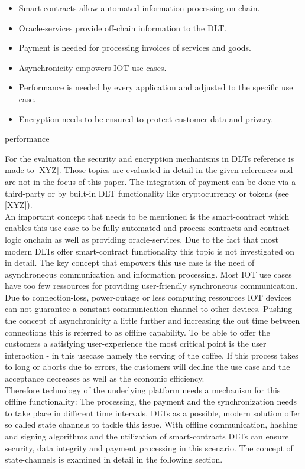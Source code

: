 \documentclass[conference]{IEEEtran}
\begin{document}
\begin{itemize}
  \item Smart-contracts allow automated information processing on-chain.
  \item Oracle-services provide off-chain information to the DLT.
  \item Payment is needed for processing invoices of services and goods.
  \item Asynchronicity empowers IOT use cases.
  \item Performance is needed by every application and adjusted to the specific use case.
  \item Encryption needs to be ensured to protect customer data and privacy.
\end{itemize}

performance

For the evaluation the security and encryption mechanisms in DLTs reference is made to [XYZ]. Those topics are evaluated in detail in the given references and are not in the focus of this paper. The integration of payment can be done via a third-party or by built-in DLT functionality like cryptocurrency or tokens (see [XYZ]).\\
An important concept that needs to be mentioned is the smart-contract which enables this use case to be fully automated and process contracts and contract-logic onchain as well as providing oracle-services. Due to the fact that most modern DLTs offer smart-contract functionality this topic is not investigated on in detail. The key concept that empowers this use case is the need of asynchroneous communication and information processing. Most IOT use cases have too few ressources for providing user-friendly synchroneous communication. Due to connection-loss, power-outage or less computing ressources IOT devices can not guarantee a constant communication channel to other devices. Pushing the concept of asynchronicity a little further and increasing the out time between connections this is referred to as offline capability. To be able to offer the customers a satisfying user-experience the most critical point is the user interaction - in this usecase namely the serving of the coffee. If this process takes to long or aborts due to errors, the customers will decline the use case and the acceptance decreases as well as the economic efficiency.\\
Therefore technology of the underlying platform needs a mechanism for this offline functionality: The processing, the payment and the synchronization needs to take place in different time intervals. DLTs as a possible, modern solution offer so called state channels to tackle this issue. With offline communication, hashing and signing algorithms and the utilization of smart-contracts DLTs can ensure security, data integrity and payment processing in this scenario. The concept of state-channels is examined in detail in the following section.\\
\end{document}
